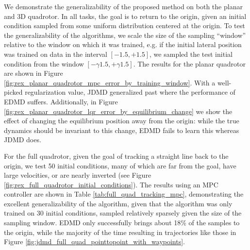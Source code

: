 \documentclass{article}
\begin{document}
We demonstrate the generalizability of the proposed method on both the planar and 3D 
quadrotor. In all tasks, the goal is to return to the origin, given an initial condition 
sampled from some uniform distribution centered at the origin. To test the generalizability
of the algorithms, we scale the size of the sampling ``window'' relative to the window on 
which it was trained, 
e.g. if the initial lateral position was trained on 
data in the interval $[-1.5,+1.5]$, we sampled the test initial condition from the window 
$[-\gamma 1.5, +\gamma 1.5]$. The results for the planar quadrotor are shown in Figure 
\ref{fig:rex_planar_quadrotor_mpc_error_by_training_window}. With a well-picked 
regularization value, JDMD generalized past where the performance of EDMD suffers. 
Additionally, in Figure \ref{fig:rex_planar_quadrotor_lqr_error_by_equilibrium_change} we 
show the effect of changing the equilibrium position away from the origin: while the true 
dynamics should be invariant to this change, EDMD fails to learn this whereas JDMD does.

For the full quadrotor, given the goal of tracking a straight line back to the origin, we
test 50 initial conditions, many of which are far from the goal, have large velocities, or
are nearly inverted (see Figure \ref{fig:rex_full_quadrotor_initial_conditions}). 
The results using an MPC controller are shown in Table \ref{tab:full_quad_tracking_mpc}, 
demonstrating the excellent generalizability of the algorithm, given that the algorithm 
was only trained on 30 initial conditions, sampled relatively sparsely given the size of the 
sampling window. EDMD only successfully brings about 18\% of the samples to the origin, 
while the majority of the time resulting in trajectories like those in Figure 
\ref{fig:jdmd_full_quad_pointtopoint_with_waypoints}.


\end{document}
